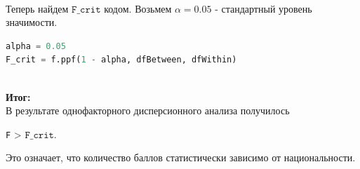 \documentclass[14pt]{extreport}
\begin{document}
\noindent
{}
\\

Теперь найдем $\mathtt{F\_crit}$ кодом. Возьмем $\alpha = 0.05$ - стандартный уровень значимости.

	\begin{lstlisting}[language=python, caption=\texttt{F}-статистика]
alpha = 0.05
F_crit = f.ppf(1 - alpha, dfBetween, dfWithin)
\end{lstlisting}

\noindent
{}
\\



\textbf{Итог:} \\
В результате однофакторного дисперсионного анализа получилось

\begin{center}
	\texttt{F} > $\mathtt{F\_crit}$.
\end{center}
Это означает, что количество баллов статистически зависимо от национальности.	
\end{document}
